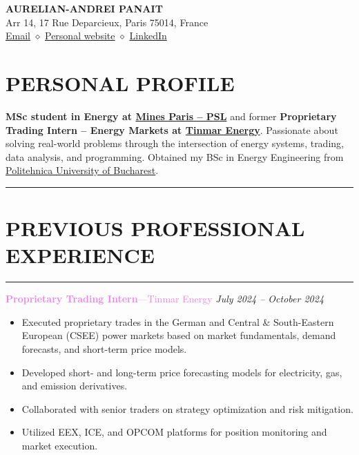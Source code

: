 \documentclass[10pt,a4paper]{article}
\newcommand{\myrule}{\noindent\rule{\linewidth}{0.4pt}}
\begin{document}
\begin{center}
    {\LARGE \textbf{AURELIAN-ANDREI PANAIT}}\\
    \vspace{0.2cm}
    Arr 14, 17 Rue Deparcieux, Paris 75014, France\\
    \href{mailto:aurelian-andrei.panait@etu.minesparis.psl.eu}{Email} $\diamond$ 
    \href{https://aurelianpanait.github.io}{Personal website} $\diamond$
    \href{https://www.linkedin.com/in/panait-andrei-52b598100/}{LinkedIn}
\end{center}

\section*{PERSONAL PROFILE}
\textbf{MSc student in Energy at \href{https://www.minesparis.psl.eu} {Mines Paris – PSL}} and former \textbf{Proprietary Trading Intern – Energy Markets at \href{https://tinmar.ro/en/} {Tinmar Energy}}. Passionate about solving real-world problems through the intersection of energy systems, trading, data analysis, and programming. Obtained my BSc in Energy Engineering from\href{https://upb.ro/}{ Politehnica University of Bucharest}.

\myrule

\section*{PREVIOUS PROFESSIONAL EXPERIENCE}
\myrule

\textcolor{violet}{\textbf{Proprietary Trading Intern}---Tinmar Energy} \hfill \textit{July 2024 – October 2024} \\[-2.0ex]
\begin{itemize}
    \item Executed proprietary trades in the German and Central \& South-Eastern European (CSEE) power markets based on market fundamentals, demand forecasts, and short-term price models.
    \item Developed short- and long-term price forecasting models for electricity, gas, and emission derivatives.
    \item Collaborated with senior traders on strategy optimization and risk mitigation.
    \item Utilized EEX, ICE, and OPCOM platforms for position monitoring and market execution.
\end{itemize}

\vspace{0.3cm}
\end{document}
